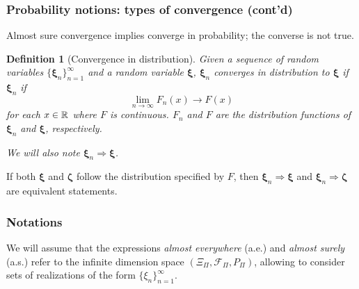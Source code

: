 \documentclass{beamer}
\newtheorem{defi}{Definition}
\def\bxi{\boldsymbol\xi}
\begin{document}
\begin{frame}
\frametitle{Probability notions: types of convergence (cont'd)}

Almost sure convergence implies converge in probability; the converse is not true.

\begin{defi}[Convergence in distribution]
Given a sequence of random variables $\lbrace \bxi_n \rbrace_{n=1}^{\infty}$ and a random variable $\bxi$, $\bxi_n$ converges in distribution to $\bxi$ if $\bxi_n$ if
$$
\lim_{n \rightarrow \infty} F_n(x) \rightarrow F(x)
$$
for each $x \in %
\rit$ %
where $F$ is continuous. $F_n$ and $F$ are the distribution functions of $\bxi_n$ and $\bxi$, respectively.

\mbox{}

We will also note $\bxi_n \Rightarrow \bxi$.
\end{defi}

\mbox{}

If both $\bxi$ and $\boldsymbol{\zeta}$ follow the distribution specified by $F$, then $\bxi_n \Rightarrow \bxi$ and $\bxi_n \Rightarrow \boldsymbol{\zeta}$ are equivalent statements.

\end{frame}

\begin{frame}
\frametitle{Notations}

We will assume that the expressions  \textsl{\blue almost everywhere} (a.e.) and \textsl{\blue almost surely} (a.s.) refer to the infinite dimension space  $\left( \Xi_{\Pi}, \mathcal{F}_{\Pi}, P_{\Pi} \right)$, allowing to %
consider sets of realizations %
of the form $\{\xi_n\}_{n=1}^{\infty}$.

\mbox{}




\end{frame}
\end{document}
